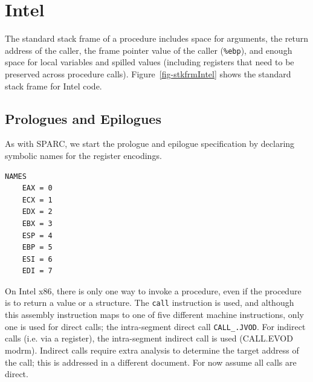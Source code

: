 \section*{Intel}

The standard stack frame of a procedure includes space for arguments,
the return address of the caller, the frame pointer value of the
caller (\texttt{\%ebp}), and enough space for local variables and
spilled values (including registers that need to be preserved across
procedure calls).  Figure~\ref{fig-stkfrmIntel} shows the standard
stack frame for Intel code.

\centerfigbegin
{}

\subsection{Prologues and Epilogues}

As with SPARC, we start the prologue and epilogue specification by
declaring symbolic names for the register encodings.

\begin{verbatim}
NAMES
    EAX = 0
    ECX = 1
    EDX = 2
    EBX = 3
    ESP = 4
    EBP = 5
    ESI = 6
    EDI = 7
\end{verbatim}

On Intel x86, there is only one way to invoke a procedure, even if
the procedure is to return a value or a structure.  The \texttt{call}
instruction is used, and although this assembly instruction maps to
one of five different machine instructions, only one is used for
direct calls; the intra-segment direct call {\tt CALL\_.JVOD}.  For
indirect calls (i.e. via a register), the intra-segment indirect call
is used (CALL.EVOD modrm).  Indirect calls require extra analysis to
determine the target address of the call; this is addressed in a
different document.  For now assume all calls are direct.

